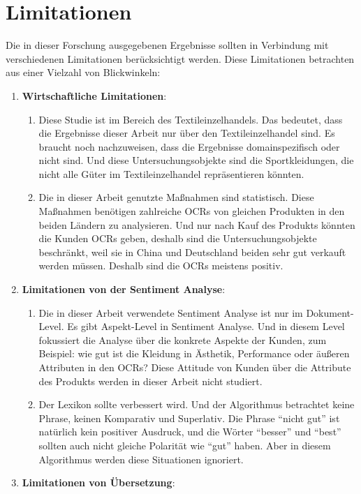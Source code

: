 \section{Limitationen}
Die in dieser Forschung ausgegebenen Ergebnisse sollten in Verbindung mit verschiedenen Limitationen berücksichtigt werden. Diese Limitationen betrachten aus einer Vielzahl von Blickwinkeln:
\begin{enumerate}
	\item \textbf{Wirtschaftliche Limitationen}: 
	\begin{enumerate}
        	\item Diese Studie ist im Bereich des Textileinzelhandels. Das bedeutet, dass die Ergebnisse dieser Arbeit nur über den Textileinzelhandel sind. Es braucht noch nachzuweisen, dass die Ergebnisse domainspezifisch oder nicht sind. Und diese Untersuchungsobjekte sind die Sportkleidungen, die nicht alle Güter im Textileinzelhandel repräsentieren könnten.
        	\item Die in dieser Arbeit genutzte Maßnahmen sind statistisch. Diese Maßnahmen benötigen zahlreiche \ac{OCRs} von gleichen Produkten in den beiden Ländern zu analysieren. Und nur nach Kauf des Produkts könnten die Kunden \ac{OCRs} geben, deshalb sind die Untersuchungsobjekte beschränkt, weil sie in China und Deutschland beiden sehr gut verkauft werden müssen. Deshalb sind die \ac{OCRs} meistens positiv. 
        \end{enumerate} 
	\item \textbf{Limitationen von der Sentiment Analyse}:
	\begin{enumerate}
		\item Die in dieser Arbeit verwendete Sentiment Analyse ist nur im Dokument-Level. Es gibt Aspekt-Level in Sentiment Analyse. Und in diesem Level fokussiert die Analyse über die konkrete Aspekte der Kunden, zum Beispiel: wie gut ist die Kleidung in Ästhetik, Performance oder äußeren Attributen in den \ac{OCRs}? Diese Attitude von Kunden über die Attribute des Produkts werden in dieser Arbeit nicht studiert.
		\item Der Lexikon sollte verbessert wird. Und der Algorithmus betrachtet keine Phrase, keinen Komparativ und Superlativ. Die Phrase ``nicht gut'' ist natürlich kein positiver Ausdruck, und die Wörter ``besser'' und ``best'' sollten auch nicht gleiche Polarität wie ``gut'' haben. Aber in diesem Algorithmus werden diese Situationen ignoriert. 
	\end{enumerate}
	\item \textbf{Limitationen von Übersetzung}:

\end{enumerate}
